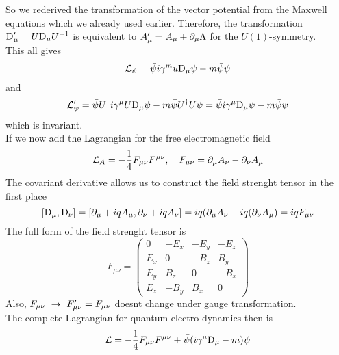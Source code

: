 So we rederived the transformation of the vector potential from the Maxwell equations which we already used earlier. Therefore, the transformation ${\rm D}'_\mu = U {\rm D}_\mu U^{-1}$ is equivalent to $A'_\mu = A_\mu + \partial_\mu \Lambda$ for the $U(1)$-symmetry.\\
This all gives
\[ \mathcal{L}_\psi = \bar{\psi} i \gamma^mu {\rm D}_\mu \psi - m \bar{\psi}\psi\]
and
\[ \mathcal{L}'_\psi = \bar{\psi} U^\dagger i \gamma^\mu U {\rm D}_\mu \psi - m \bar{\psi}U^\dagger U \psi = \bar{\psi}i \gamma^\mu {\rm D}_\mu \psi - m \bar{\psi}\psi\]
which is invariant.\\
If we now add the Lagrangian for the free electromagnetic field
\[ \mathcal{L}_A = - \frac{1}{4} F_{\mu \nu} F^{\mu \nu}, ~~~ F_{\mu \nu} = \partial_\mu A_\nu - \partial_\nu A_\mu\]
The covariant derivative allows us to construct the field strenght tensor in the first place
\[ [{\rm D}_\mu, {\rm D}_\nu] = [ \partial_\mu + i q A_\mu, \partial_\nu + i q A_\nu] = i q ( \partial_\mu A_\nu - iq ( \partial_\nu A_\mu) = iq F_{\mu\nu}\]
The full form of the field strenght tensor is
\[ F_{\mu\nu} = \begin{pmatrix} 0 & -E_x & - E_y & -E_z \\
E_x & 0 & - B_z & B_y \\
E_y & B_z & 0 & - B_x \\
E_z & -B_y & B_x & 0 \end{pmatrix}\]
Also, $F_{\mu\nu} ~\rightarrow~F'_{\mu\nu} = F_{\mu\nu}$ doesnt change under gauge transformation.\\
The complete Lagrangian for quantum electro dynamics then is
\[\mathcal{L} = -\frac{1}{4} F_{\mu\nu}F^{\mu\nu} + \bar{\psi} ( i \gamma^\mu {\rm D}_\mu - m )\psi\]
